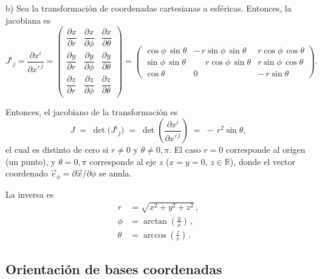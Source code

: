 \documentclass[../apunte_mecanica_clasica.tex]{subfiles}%
\begin{document}
\begin{apuntebloque}{}


b) Sea la transformación de coordenadas cartesianas a esféricas. Entonces, la jacobiana es
\begin{equation*}
J^{i}{}_{j}
=\frac{\partial x^{i}}{\partial x'^{\,j}}
=\begin{pmatrix}
\dfrac{\partial x}{\partial r} & \dfrac{\partial x}{\partial \phi} & \dfrac{\partial x}{\partial \theta}\\[8pt]
\dfrac{\partial y}{\partial r} & \dfrac{\partial y}{\partial \phi} & \dfrac{\partial y}{\partial \theta}\\[8pt]
\dfrac{\partial z}{\partial r} & \dfrac{\partial z}{\partial \phi} & \dfrac{\partial z}{\partial \theta}
\end{pmatrix}
=\begin{pmatrix}
\cos\phi\,\sin\theta & -\,r\sin\phi\,\sin\theta & r\cos\phi\,\cos\theta\\
\sin\phi\,\sin\theta & \phantom{-}\,r\cos\phi\,\sin\theta & r\sin\phi\,\cos\theta\\
\cos\theta & 0 & -\,r\sin\theta
\end{pmatrix}.
\end{equation*}

Entonces, el jacobiano de la transformación es
\begin{equation*}
J \;=\; \det\!\big(J^{i}{}_{j}\big)
\;=\; \det\!\left(\frac{\partial x^{i}}{\partial x'^{\,j}}\right)
\;=\; -\,r^{2}\sin\theta,
\end{equation*}
el cual es distinto de cero si $r\neq 0$ y $\theta\neq 0,\pi$. El caso $r=0$ corresponde al origen (un punto), y $\theta=0,\pi$ corresponde al eje $z$ ($x=y=0$, $z\in\mathbb{R}$), donde el vector coordenado $\vec e_{\phi}=\partial \vec x/\partial \phi$ se anula.

La inversa es
\begin{align*}
r &= \sqrt{x^{2}+y^{2}+z^{2}}\,,\\[6pt]
\phi &= \arctan\!\left(\frac{y}{x}\right)\,,\\[6pt]
\theta &= \arccos\!\left(\frac{z}{r}\right)\,.
\end{align*}

\end{apuntebloque}


\newpage

\subsection{Orientación de bases coordenadas}
\end{document}
